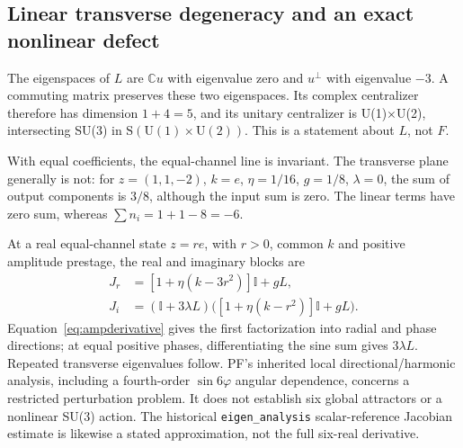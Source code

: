\documentclass[11pt,a4paper]{article}
\numberwithin{equation}{section}
\newcommand{\C}{\mathbb C}\newcommand{\R}{\mathbb R}
\newcommand{\I}{\mathbb I}\newcommand{\Argz}{\operatorname{Arg}_0}
\begin{document}
\subsection{Linear transverse degeneracy and an exact nonlinear defect}\label{sec:counter}
The eigenspaces of $L$ are $\C u$ with eigenvalue zero and $u^\perp$ with eigenvalue $-3$. A commuting matrix preserves these two eigenspaces. Its complex centralizer therefore has dimension $1+4=5$, and its unitary centralizer is U(1)$\times$U(2), intersecting SU(3) in $\mathrm{S}(\mathrm{U}(1)\times\mathrm{U}(2))$. This is a statement about $L$, not $F$.

With equal coefficients, the equal-channel line is invariant. The transverse plane generally is not: for $z=(1,1,-2)$, $k=e$, $\eta=1/16$, $g=1/8$, $\lambda=0$, the sum of output components is $3/8$, although the input sum is zero. The linear terms have zero sum, whereas $\sum n_i=1+1-8=-6$.

At a real equal-channel state $z=re$, with $r>0$, common $k$ and positive amplitude prestage, the real and imaginary blocks are
\begin{align}
 J_r&=[1+\eta(k-3r^2)]\I+gL,\nonumber\\
 J_i&=(\I+3\lambda L)\bigl([1+\eta(k-r^2)]\I+gL\bigr).\label{eq:localblocks}
\end{align}
Equation~\eqref{eq:ampderivative} gives the first factorization into radial and phase directions; at equal positive phases, differentiating the sine sum gives $3\lambda L$. Repeated transverse eigenvalues follow. PF's inherited local directional/harmonic analysis, including a fourth-order $\sin6\varphi$ angular dependence, concerns a restricted perturbation problem. It does not establish six global attractors or a nonlinear SU(3) action. The historical \texttt{eigen\_analysis} scalar-reference Jacobian estimate is likewise a stated approximation, not the full six-real derivative.
\end{document}
